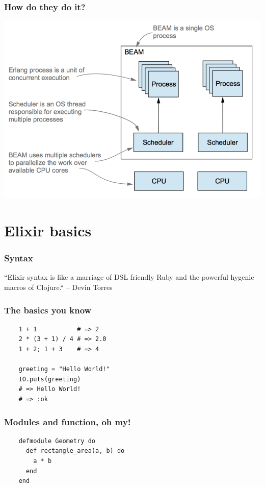 \documentclass{beamer}
\begin{document}
\begin{frame}
  \frametitle{How do they do it?}
  \includegraphics[scale=.5]{beam.png}
\end{frame}

\section[Section]{Elixir basics}

\begin{frame}
  \frametitle{Syntax}
  ``Elixir syntax is like a marriage of DSL
  friendly Ruby and the powerful hygenic macros of Clojure.``
  \linebreak
  \textrm{-- Devin Torres}
\end{frame}

\begin{frame}[fragile]
  \frametitle{The basics you know}
  \begin{lstlisting}
    1 + 1           # => 2
    2 * (3 + 1) / 4 # => 2.0
    1 + 2; 1 + 3    # => 4

    greeting = "Hello World!"
    IO.puts(greeting)
    # => Hello World!
    # => :ok
  \end{lstlisting}
\end{frame}

\begin{frame}[fragile]
  \frametitle{Modules and function, oh my!}
  \begin{lstlisting}
    defmodule Geometry do
      def rectangle_area(a, b) do
        a * b
      end
    end
  \end{lstlisting}
\end{frame}
\end{document}
